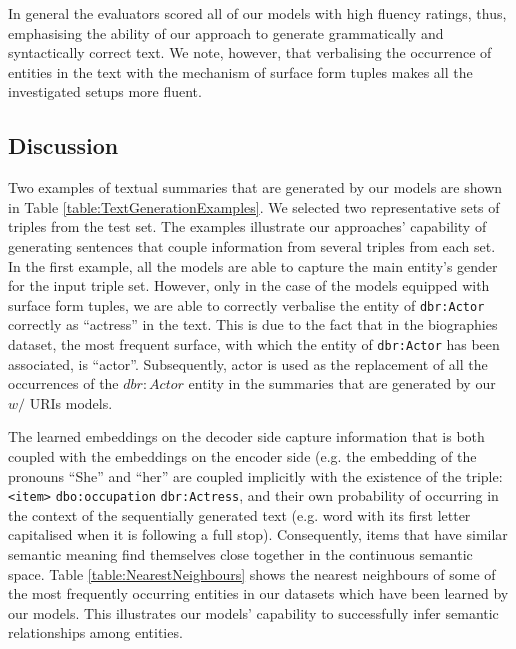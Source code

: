 \documentclass[preprint,5p]{elsarticle}
\begin{document}
In general the evaluators scored all of our models with high fluency ratings, thus, emphasising the ability of our approach to generate grammatically and syntactically correct text. We note, however, that verbalising the occurrence of entities in the text with the mechanism of surface form tuples makes all the investigated setups more fluent.







\subsection{Discussion}

Two examples of textual summaries that are generated by our models are shown in Table \ref{table:TextGenerationExamples}. We selected two representative sets of triples from the test set. The examples illustrate our approaches' capability of generating sentences that couple information from several triples from each set. In the first example, all the models are able to capture the main entity's gender for the input triple set. However, only in the case of the models equipped with surface form tuples, we are able to correctly verbalise the entity of \texttt{dbr:Actor} correctly as ``actress'' in the text. This is due to the fact that in the biographies dataset, the most frequent surface, with which the entity of \texttt{dbr:Actor} has been associated, is ``actor''. Subsequently, actor is used as the replacement of all the occurrences of the $dbr:Actor$ entity in the summaries that are generated by our $w/$ URIs models.



The learned embeddings on the decoder side capture information that is both coupled with the embeddings on the encoder side (e.g. the embedding of the pronouns ``She'' and ``her'' are coupled implicitly with the existence of the triple: \texttt{<item>} \texttt{dbo:occupation} \texttt{dbr:Actress}, and their own probability of occurring in the context of the sequentially generated text (e.g. word with its first letter capitalised when it is following a full stop). Consequently, items that have similar semantic meaning find themselves close together in the continuous semantic space. Table \ref{table:NearestNeighbours} shows the nearest neighbours of some of the most frequently occurring entities in our datasets which have been learned by our models. This illustrates our models' capability to successfully infer semantic relationships among entities.
\end{document}
